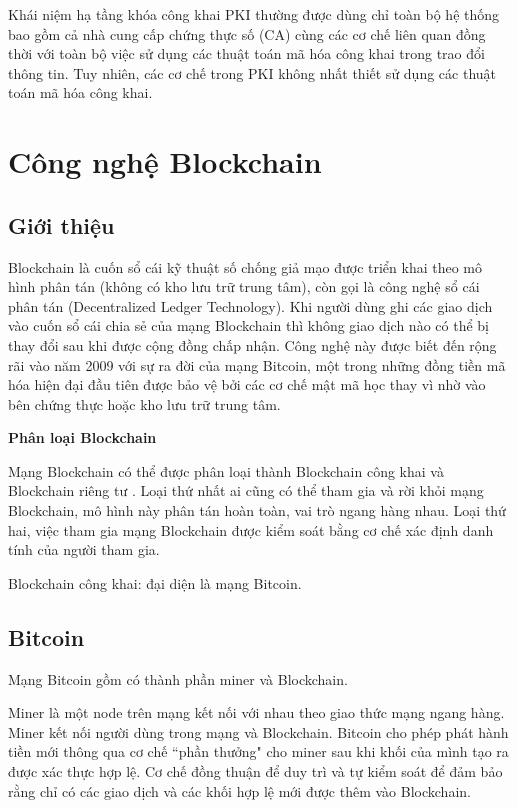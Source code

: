 Khái niệm hạ tầng khóa công khai PKI thường được dùng chỉ toàn bộ hệ thống bao gồm cả nhà cung cấp chứng thực số (CA) cùng các cơ chế liên quan đồng thời với toàn bộ việc sử dụng các thuật toán mã hóa công khai trong trao đổi thông tin. Tuy nhiên, các cơ chế trong PKI không nhất thiết sử dụng các thuật toán mã hóa công khai.

\section{Công nghệ Blockchain}
\subsection{Giới thiệu}
Blockchain là cuốn sổ cái kỹ thuật số chống giả mạo được triển khai theo mô hình phân tán (không có kho lưu trữ trung tâm), còn gọi là công nghệ sổ cái phân tán (Decentralized Ledger Technology).
Khi người dùng ghi các giao dịch vào cuốn sổ cái chia sẻ của mạng Blockchain thì không giao dịch nào có thể bị thay đổi sau khi được cộng đồng chấp nhận. 
Công nghệ này được biết đến rộng rãi vào năm 2009 với sự ra đời của mạng Bitcoin\cite{nakamoto2008bitcoin}, một trong những đồng tiền mã hóa hiện đại đầu tiên được bảo vệ bởi các cơ chế mật mã học thay vì nhờ vào bên chứng thực hoặc kho lưu trữ trung tâm.

\textbf{Phân loại Blockchain}

Mạng Blockchain có thể được phân loại thành Blockchain công khai và Blockchain riêng tư \cite{8246573}. Loại thứ nhất ai cũng có thể tham gia và rời khỏi mạng Blockchain, mô hình này phân tán hoàn toàn, vai trò ngang hàng nhau. Loại thứ hai, việc tham gia mạng Blockchain được kiểm soát bằng cơ chế xác định danh tính của người tham gia.

Blockchain công khai: đại diện là mạng Bitcoin.
\subsection{Bitcoin}
Mạng Bitcoin gồm có thành phần miner và Blockchain.

Miner là một node trên mạng kết nối với nhau theo giao thức mạng ngang hàng.
Miner kết nối người dùng trong mạng và Blockchain.
Bitcoin cho phép phát hành tiền mới thông qua cơ chế ``phần thưởng" cho miner sau khi khối của mình tạo ra được xác thực hợp lệ. Cơ chế đồng thuận để duy trì và tự kiểm soát để đảm bảo rằng chỉ có các giao dịch và các khối hợp lệ mới được thêm vào Blockchain.

